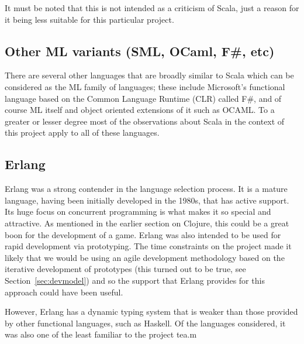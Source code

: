 It must be noted that this is not intended as a criticism of Scala, just a reason for it being less suitable for this particular project.


\subsection{Other ML variants (SML, OCaml, F\#, etc)}


There are several other languages that are broadly similar to Scala which can be considered as the ML family of languages; these include Microsoft's functional language based on the Common Language Runtime (CLR) called F\#, and of course ML itself and object oriented extensions of it such as OCAML. To a greater or lesser degree most of the observations about Scala in the context of this project apply to all of these languages.

\subsection{Erlang}



Erlang was a strong contender in the language selection process. It is a mature language, having been initially developed in the 1980s, that has active support. Its huge focus on concurrent programming is what makes it so special and attractive. As mentioned in the earlier section on Clojure, this could be a great boon for the development of a game. Erlang was also intended to be used for rapid development via prototyping. The time constraints on the project made it likely that we would be using an agile development methodology based on the iterative development of prototypes (this turned out to be true, see Section~\ref{sec:devmodel}) and so the support that Erlang provides for this approach could have been useful.

However, Erlang has a dynamic typing system that is weaker than those provided by other functional languages, such as Haskell. Of the languages considered, it was also one of the least familiar to the project tea.m

